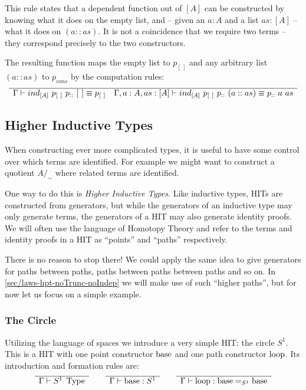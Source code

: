 This rule states that a dependent function out of $[A]$ can be constructed by
knowing what it does on the empty list, and -- given an $a:A$ and a list $as:[A]$ -- what
it does on $(a :: as)$. It is not a coincidence that we require two terms --
they correspond precisely to the two constructors.

The resulting function maps the empty list to $p_{[~]}$ and any arbitrary list
$(a::as)$ to $p_{cons}$ by the computation rules:
\[
  \begin{array}{c}
    \hline
    \Gamma \vdash ind_{[A]}~p_{[~]}~p_{::}~[~] \equiv p_{[~]}
  \end{array}
  \\
  \begin{array}{c}
    \hline
    \Gamma, a:A, as:[A] \vdash ind_{[A]}~p_{[~]}~p_{::}~(a::as) \equiv p_{::}~a~as
  \end{array}
\]

\subsection{Higher Inductive Types}

When constructing ever more complicated types, it is useful to have some
control over which terms are identified. For example we might want to construct
a quotient $A/_\sim$ where related terms are identified.

One way to do this is \emph{Higher Inductive Types}. Like inductive types, HITs
are constructed from generators, but while the generators of an inductive type
may only generate terms, the generators of a HIT may also generate identity
proofs. We will often use the language of Homotopy Theory and refer to the terms
and identity proofs in a HIT as ``points'' and ``paths'' respectively.

There is no reason to stop there! We could apply the same idea to give
generators for paths between paths, paths between paths between
paths and so on. In \autoref{sec/laws-hpt-noTrunc-noIndep} we will make use of
such ``higher paths'', but for now let us focus on a simple example.

\subsubsection{The Circle}
Utilizing the language of spaces we introduce a very simple HIT: the circle
$S^1$. This is a HIT with one point constructor $\operatorname{base}$ and one path constructor
$\operatorname{loop}$. Its introduction and formation rules are:
\begin{equation*}
  \begin{array}[t]{c}
    \hline
    \Gamma \vdash S^1 \; \operatorname{Type}\\
  \end{array}
  \qquad
  \begin{array}[t]{c}
    \hline
    \Gamma \vdash \operatorname{base} : S^1\\
  \end{array}
  \qquad
  \begin{array}[t]{c}
    \hline
    \Gamma \vdash \operatorname{loop} : \operatorname{base} =_{S^1} \operatorname{base}
  \end{array}
\end{equation*}

